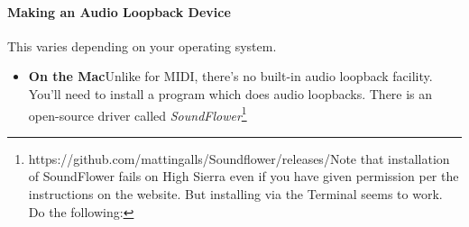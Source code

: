 \documentclass{article}
\begin{document}
\paragraph{Making an Audio Loopback Device}  This varies depending on your operating system.
\begin{itemize}
\item {\bf On the Mac}\quad Unlike for MIDI, there's no built-in audio loopback facility.  You'll need to install a program which does audio loopbacks.  There is an open-source driver called {\it SoundFlower}\footnote{https:/\!/github.com/mattingalls/Soundflower/releases/\qquad Note that installation of SoundFlower fails on High Sierra even if you have given permission per the instructions on the website.  But installing via the Terminal seems to work.  Do the following:

}
\end{itemize}
\end{document}
